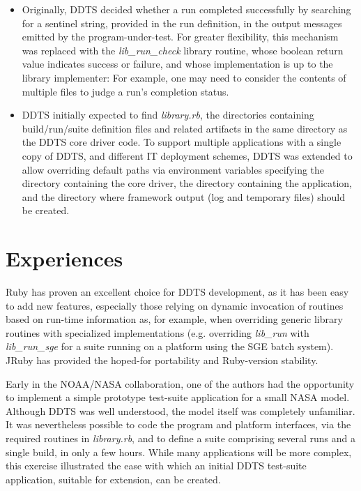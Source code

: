 \documentclass[conference]{IEEEtran}
\begin{document}
\begin{itemize}
\item Originally, DDTS decided whether a run completed successfully by searching for a sentinel string, provided in the run definition, in the output messages emitted by the program-under-test. For greater flexibility, this mechanism was replaced with the \emph{lib\_run\_check} library routine, whose boolean return value indicates success or failure, and whose implementation is up to the library implementer: For example, one may need to consider the contents of multiple files to judge a run's completion status.
\item DDTS initially expected to find \emph{library.rb}, the directories containing build/run/suite definition files and related artifacts in the same directory as the DDTS core driver code. To support multiple applications with a single copy of DDTS, and different IT deployment schemes, DDTS was extended to allow overriding default paths via environment variables specifying the directory containing the core driver, the directory containing the application, and the directory where framework output (log and temporary files) should be created.
\end{itemize}

\section{Experiences}

Ruby has proven an excellent choice for DDTS development, as it has been easy to add new features, especially those relying on dynamic invocation of routines based on run-time information as, for example, when overriding generic library routines with specialized implementations (e.g. overriding \emph{lib\_run} with \emph{lib\_run\_sge} for a suite running on a platform using the SGE batch system). JRuby has provided the hoped-for portability and Ruby-version stability.

Early in the NOAA/NASA collaboration, one of the authors had the opportunity to implement a simple prototype test-suite application for a small NASA model. Although DDTS was well understood, the model itself was completely unfamiliar. It was nevertheless possible to code the program and platform interfaces, via the required routines in \emph{library.rb}, and to define a suite comprising several runs and a single build, in only a few hours. While many applications will be more complex, this exercise illustrated the ease with which an initial DDTS test-suite application, suitable for extension, can be created.
\end{document}
